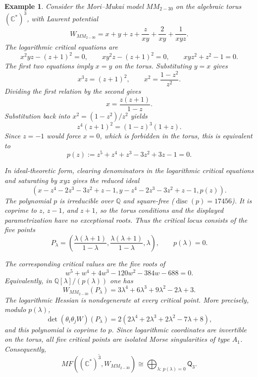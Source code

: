 \documentclass[11pt]{amsart}
\newtheorem{example}{Example}[section]
\newcommand{\MorseCat}[1]{\mathsf{Q}_{#1}}
\begin{document}
\begin{example}
Consider the Mori--Mukai model $MM_{2-30}$ on the algebraic torus
$(\mathbb{C}^*)^3$, with Laurent potential
\[
W_{MM_{2-30}}=x+y+z+\frac{z}{xy}+\frac{2}{xy}+\frac{1}{xyz}.
\]
The logarithmic critical equations are
\[
x^2yz-(z+1)^2=0,
\qquad
xy^2z-(z+1)^2=0,
\qquad
xyz^2+z^2-1=0.
\]
The first two equations imply $x=y$ on the torus. Substituting $y=x$ gives
\[
x^3z=(z+1)^2,
\qquad
x^2=\frac{1-z^2}{z^2}.
\]
Dividing the first relation by the second gives
\[
x=\frac{z(z+1)}{1-z}.
\]
Substitution back into $x^2=(1-z^2)/z^2$ yields
\[
z^4(z+1)^2=(1-z)^3(1+z).
\]
Since $z=-1$ would force $x=0$, which is forbidden in the torus, this is
equivalent to
\[
p(z):=z^5+z^4+z^3-3z^2+3z-1=0.
\]

In ideal-theoretic form, clearing denominators in the logarithmic critical
equations and saturating by $xyz$ gives the reduced ideal
\[
\left(
x-z^4-2z^3-3z^2+z-1,
y-z^4-2z^3-3z^2+z-1,
p(z)
\right).
\]
The polynomial $p$ is irreducible over $\mathbb{Q}$ and square-free
($\operatorname{disc}(p)=17456$). It is coprime to $z$, $z-1$, and $z+1$, so
the torus conditions and the displayed parametrization have no exceptional
roots. Thus the critical locus consists of the five points
\[
P_{\lambda}=\left(
\frac{\lambda(\lambda+1)}{1-\lambda},
\frac{\lambda(\lambda+1)}{1-\lambda},
\lambda
\right),
\qquad
p(\lambda)=0.
\]

The corresponding critical values are the five roots of
\[
w^5+w^4+4w^3-120w^2-384w-688=0.
\]
Equivalently, in $\mathbb{Q}[\lambda]/(p(\lambda))$ one has
\[
W_{MM_{2-30}}(P_{\lambda})
=3\lambda^4+6\lambda^3+9\lambda^2-2\lambda+3.
\]
The logarithmic Hessian is nondegenerate at every critical point. More
precisely, modulo $p(\lambda)$,
\[
\det(\theta_i\theta_jW)(P_{\lambda})
=2(2\lambda^4+2\lambda^3+2\lambda^2-7\lambda+8),
\]
and this polynomial is coprime to $p$. Since logarithmic coordinates are
invertible on the torus, all five critical points are isolated Morse
singularities of type $A_1$. Consequently,
\[
\overline{MF((\mathbb{C}^*)^3,W_{MM_{2-30}})}
\cong \bigoplus_{\lambda:\,p(\lambda)=0}\MorseCat{3}.
\]
\end{example}
\end{document}
